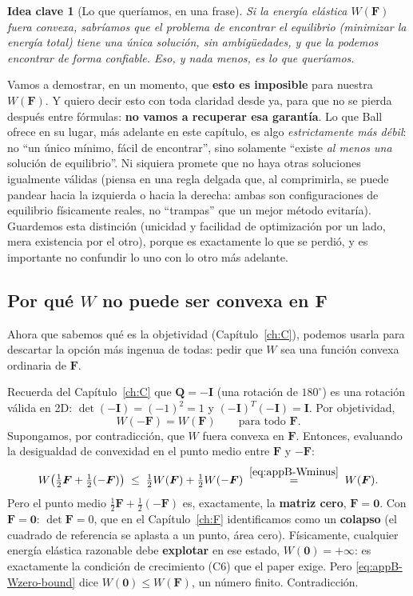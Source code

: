 \documentclass[11pt,a4paper]{article}
\newtheorem{takeaway}{Idea clave}
\begin{document}
\begin{takeaway}[Lo que quer\'iamos, en una frase]
Si la energ\'ia el\'astica $W(\bm F)$ fuera convexa, sabr\'iamos que el
problema de encontrar el equilibrio (minimizar la energ\'ia total) tiene
una \'unica soluci\'on, sin ambig\"uedades, y que la podemos encontrar
de forma confiable. Eso, y nada menos, es lo que quer\'iamos.
\end{takeaway}

Vamos a demostrar, en un momento, que \textbf{esto es imposible} para
nuestra $W(\bm F)$. Y quiero decir esto con toda claridad desde ya,
para que no se pierda despu\'es entre f\'ormulas: \textbf{no vamos a
recuperar esa garant\'ia}. Lo que Ball ofrece en su lugar, m\'as
adelante en este cap\'itulo, es algo \emph{estrictamente m\'as d\'ebil}:
no ``un \'unico m\'inimo, f\'acil de encontrar'', sino solamente
``existe \emph{al menos una} soluci\'on de equilibrio''. Ni siquiera
promete que no haya otras soluciones igualmente v\'alidas (piensa en
una regla delgada que, al comprimirla, se puede pandear hacia la
izquierda o hacia la derecha: ambas son configuraciones de equilibrio
f\'isicamente reales, no ``trampas'' que un mejor m\'etodo evitar\'ia).
Guardemos esta distinci\'on (unicidad y facilidad de optimizaci\'on
por un lado, mera existencia por el otro), porque es exactamente lo
que se perdi\'o, y es importante no confundir lo uno con lo otro m\'as
adelante.

\subsection{Por qu\'e $W$ no puede ser convexa en $\bm F$}

Ahora que sabemos qu\'e es la objetividad (Cap\'itulo~\ref{ch:C}),
podemos usarla para descartar la opci\'on m\'as ingenua de todas: pedir
que $W$ sea una funci\'on convexa ordinaria de $\bm F$.

Recuerda del Cap\'itulo~\ref{ch:C} que $\bm Q=-\bm I$ (una rotaci\'on de
$180^\circ$) es una rotaci\'on v\'alida en 2D:
$\det(-\bm I)=(-1)^2=1$ y $(-\bm I)^T(-\bm I)=\bm I$. Por objetividad,
\begin{equation}
 W(-\bm F)=W(\bm F)\qquad\text{para todo }\bm F.
 \label{eq:appB-Wminus}
\end{equation}
Supongamos, por contradicci\'on, que $W$ fuera convexa en $\bm F$.
Entonces, evaluando la desigualdad de convexidad en el punto medio
entre $\bm F$ y $-\bm F$:
\begin{equation}
 W\!\left(\tfrac12\bm F+\tfrac12(-\bm F)\right)
 \;\leq\;\tfrac12W(\bm F)+\tfrac12W(-\bm F)
 \;\overset{\eqref{eq:appB-Wminus}}{=}\;W(\bm F).
 \label{eq:appB-Wzero-bound}
\end{equation}
Pero el punto medio $\tfrac12\bm F+\tfrac12(-\bm F)$ es, exactamente,
la \textbf{matriz cero}, $\bm F=\bm 0$. Con $\bm F=\bm 0$: $\det\bm F=0$,
que en el Cap\'itulo~\ref{ch:F} identificamos como un \textbf{colapso}
(el cuadrado de referencia se aplasta a un punto, \'area cero).
F\'isicamente, cualquier energ\'ia el\'astica razonable debe
\textbf{explotar} en ese estado, $W(\bm 0)=+\infty$: es exactamente
la condici\'on de crecimiento (C6) que el paper exige. Pero
\eqref{eq:appB-Wzero-bound} dice $W(\bm 0)\leq W(\bm F)$, un n\'umero
finito. Contradicci\'on.
\end{document}

